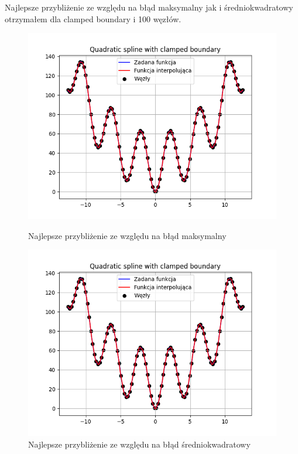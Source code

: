 \documentclass{article}
\begin{document}
Najlepsze przybliżenie ze względu na błąd maksymalny jak i średniokwadratowy otrzymałem dla clamped boundary i 100 węzłów.

\begin{figure}[H]
  \begin{minipage}[b]{0.49\textwidth}
    \includegraphics[width=\textwidth]{img26.png}
    \caption{Najlepsze przybliżenie ze względu na błąd maksymalny}
  \end{minipage}
  \hfill
  \begin{minipage}[b]{0.49\textwidth}
    \includegraphics[width=\textwidth]{img27.png}
    \caption{Najlepsze przybliżenie ze względu na błąd średniokwadratowy}
  \end{minipage}
\end{figure}
\end{document}
